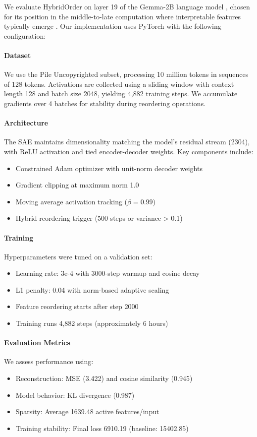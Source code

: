 \documentclass{article} %
\begin{document}
We evaluate HybridOrder on layer 19 of the Gemma-2B language model \cite{gpt4}, chosen for its position in the middle-to-late computation where interpretable features typically emerge \cite{gaoScalingEvaluatingSparse}. Our implementation uses PyTorch \cite{paszke2019pytorch} with the following configuration:

\paragraph{Dataset} We use the Pile Uncopyrighted subset, processing 10 million tokens in sequences of 128 tokens. Activations are collected using a sliding window with context length 128 and batch size 2048, yielding 4,882 training steps. We accumulate gradients over 4 batches for stability during reordering operations.

\paragraph{Architecture} The SAE maintains dimensionality matching the model's residual stream (2304), with ReLU activation and tied encoder-decoder weights. Key components include:
\begin{itemize}
    \item Constrained Adam optimizer with unit-norm decoder weights
    \item Gradient clipping at maximum norm 1.0
    \item Moving average activation tracking ($\beta=0.99$)
    \item Hybrid reordering trigger (500 steps or variance > 0.1)
\end{itemize}

\paragraph{Training} Hyperparameters were tuned on a validation set:
\begin{itemize}
    \item Learning rate: 3e-4 with 3000-step warmup and cosine decay
    \item L1 penalty: 0.04 with norm-based adaptive scaling
    \item Feature reordering starts after step 2000
    \item Training runs 4,882 steps (approximately 6 hours)
\end{itemize}

\paragraph{Evaluation Metrics} We assess performance using:
\begin{itemize}
    \item Reconstruction: MSE (3.422) and cosine similarity (0.945)
    \item Model behavior: KL divergence (0.987)
    \item Sparsity: Average 1639.48 active features/input
    \item Training stability: Final loss 6910.19 (baseline: 15402.85)
\end{itemize}
\end{document}

